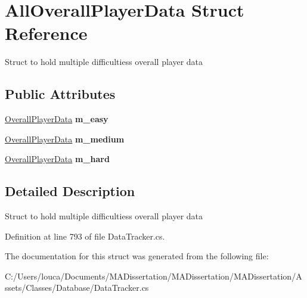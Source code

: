 \hypertarget{struct_all_overall_player_data}{}\section{All\+Overall\+Player\+Data Struct Reference}
\label{struct_all_overall_player_data}


Struct to hold multiple difficulties\textquotesingle{}s overall player data  


\subsection*{Public Attributes}
\begin{DoxyCompactItemize}
\item 
\mbox{\label{struct_all_overall_player_data_a8d6556bf610d5f910b198f5593e28c18}} 
\mbox{\hyperlink{struct_overall_player_data}{Overall\+Player\+Data}} {\bfseries m\+\_\+easy}
\item 
\mbox{\label{struct_all_overall_player_data_a6736fb69c263366712bedb10ac16e681}} 
\mbox{\hyperlink{struct_overall_player_data}{Overall\+Player\+Data}} {\bfseries m\+\_\+medium}
\item 
\mbox{\label{struct_all_overall_player_data_afaf16d31c3a4af551ee3b941e2a3d38e}} 
\mbox{\hyperlink{struct_overall_player_data}{Overall\+Player\+Data}} {\bfseries m\+\_\+hard}
\end{DoxyCompactItemize}


\subsection{Detailed Description}
Struct to hold multiple difficulties\textquotesingle{}s overall player data 



Definition at line 793 of file Data\+Tracker.\+cs.



The documentation for this struct was generated from the following file\+:\begin{DoxyCompactItemize}
\item 
C\+:/\+Users/louca/\+Documents/\+M\+A\+Dissertation/\+M\+A\+Dissertation/\+M\+A\+Dissertation/\+Assets/\+Classes/\+Database/Data\+Tracker.\+cs\end{DoxyCompactItemize}
